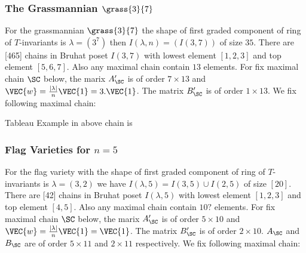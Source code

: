     \subsubsection{The Grassmannian \(\grass{3}{7}\)}
        For the grassmannian \(\grass{3}{7}\) 
        the shape of first graded component of ring of \(T\)-invariants is \(\lambda=(3^7)\)
        then \(I(\lambda,n)=(I(3,7))\) of size \(35\). 
        There are [465] chains in Bruhat poset \(I(3,7)\) 
        with lowest element \([1,2,3]\) and top element \([5,6,7]\).
        Also any maximal chain contain \(13\) elements. 
        For fix maximal chain \(\SC\) below, the marix \(A'_{\SC}\) is of order \(7 \times 13\) and 
        \(\VEC{w} = \frac{|\lambda|}{n} \VEC{1} = 3.\VEC{1} \).
        The matrix \(B'_{\SC}\) is of order \(1 \times 13\).
        We fix following maximal chain:
         
        
        Tableau Example in above chain is
        
    \subsubsection{Flag Varieties for \(n=5\)}
        For the flag variety with
        the shape of first graded component of ring of \(T\)-invariants is \(\lambda=(3,2)\)
        we have \(I(\lambda,5)=I(3,5) \cup I(2,5)\) of size \([20]\). 
        There are [42] chains in Bruhat poset \(I(\lambda,5)\) 
        with lowest element \([1,2,3]\) and top element \([4,5]\).
        Also any maximal chain contain \(10?\) elements. 
        For fix maximal chain \(\SC\) below, the marix \(A'_{\SC}\) is of order \(5 \times 10\) and 
        \(\VEC{w} = \frac{|\lambda|}{n} \VEC{1} = \VEC{1} \).
        The matrix \(B'_{\SC}\) is of order \(2 \times 10\). 
        \(A_{\SC}\) and \(B_{\SC}\) are of order \(5 \times 11\) and \(2 \times 11\) respectively.
        We fix following maximal chain:
        
        
        
        
%
%


